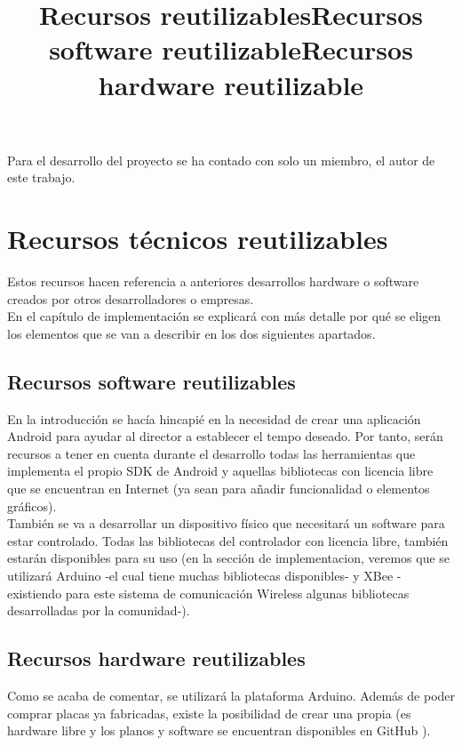 Para el desarrollo del proyecto se ha contado con solo un miembro, el autor de este trabajo.\\

\title{Recursos reutilizables}
\section{Recursos técnicos reutilizables}

Estos recursos hacen referencia a anteriores desarrollos hardware o software creados
por otros desarrolladores o empresas.\\

En el capítulo de implementación se explicará con más detalle por qué se
eligen los elementos que se van a describir en los dos siguientes apartados.\\


\subsection{Recursos software reutilizables}
\title{Recursos software reutilizable}

En la introducción se hacía hincapié en la necesidad de crear una aplicación
Android para ayudar al director a establecer el tempo deseado. Por tanto,
serán recursos a tener en cuenta durante el desarrollo todas las herramientas
que implementa el propio SDK de Android y aquellas bibliotecas con licencia
libre que se encuentran en Internet (ya sean para añadir funcionalidad o elementos
gráficos).\\


También se va a desarrollar un dispositivo físico que necesitará un software para estar
controlado. Todas las bibliotecas del controlador con licencia libre, también estarán
disponibles para su uso (en la sección de implementacion, veremos que se utilizará
Arduino -el cual tiene muchas bibliotecas disponibles- y XBee -existiendo para este
sistema de comunicación Wireless algunas bibliotecas desarrolladas por la comunidad-).\\



\subsection{Recursos hardware reutilizables}
\title{Recursos hardware reutilizable}

Como se acaba de comentar, se utilizará la plataforma Arduino. Además de poder comprar
placas ya fabricadas, existe la posibilidad de crear una propia (es hardware libre y
los planos y software se encuentran disponibles en GitHub \cite{arduinoRepo}).\\

